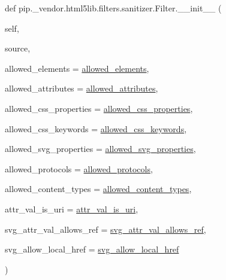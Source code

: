 {\footnotesize\ttfamily def pip.\+\_\+vendor.\+html5lib.\+filters.\+sanitizer.\+Filter.\+\_\+\+\_\+init\+\_\+\+\_\+ (\begin{DoxyParamCaption}\item[{}]{self,  }\item[{}]{source,  }\item[{}]{allowed\+\_\+elements = {\ttfamily \hyperlink{classpip_1_1__vendor_1_1html5lib_1_1filters_1_1sanitizer_1_1Filter_adcd9514fffd4234aa1285720ebfb7b17}{allowed\+\_\+elements}},  }\item[{}]{allowed\+\_\+attributes = {\ttfamily \hyperlink{classpip_1_1__vendor_1_1html5lib_1_1filters_1_1sanitizer_1_1Filter_a6f70ea4be9c51b9b91c2e566559b884b}{allowed\+\_\+attributes}},  }\item[{}]{allowed\+\_\+css\+\_\+properties = {\ttfamily \hyperlink{classpip_1_1__vendor_1_1html5lib_1_1filters_1_1sanitizer_1_1Filter_a416794d8c838f27522a46468132a39f3}{allowed\+\_\+css\+\_\+properties}},  }\item[{}]{allowed\+\_\+css\+\_\+keywords = {\ttfamily \hyperlink{classpip_1_1__vendor_1_1html5lib_1_1filters_1_1sanitizer_1_1Filter_a7c7289763ca64b15575862a15816afed}{allowed\+\_\+css\+\_\+keywords}},  }\item[{}]{allowed\+\_\+svg\+\_\+properties = {\ttfamily \hyperlink{classpip_1_1__vendor_1_1html5lib_1_1filters_1_1sanitizer_1_1Filter_af9bca56a7a284c172d28da58c49a87a2}{allowed\+\_\+svg\+\_\+properties}},  }\item[{}]{allowed\+\_\+protocols = {\ttfamily \hyperlink{classpip_1_1__vendor_1_1html5lib_1_1filters_1_1sanitizer_1_1Filter_a0ae8ca41be5bfb1bff4fb2846216afa9}{allowed\+\_\+protocols}},  }\item[{}]{allowed\+\_\+content\+\_\+types = {\ttfamily \hyperlink{classpip_1_1__vendor_1_1html5lib_1_1filters_1_1sanitizer_1_1Filter_a12c8958496fa39ad6f2aa9048afe69b2}{allowed\+\_\+content\+\_\+types}},  }\item[{}]{attr\+\_\+val\+\_\+is\+\_\+uri = {\ttfamily \hyperlink{classpip_1_1__vendor_1_1html5lib_1_1filters_1_1sanitizer_1_1Filter_a60507caa7929ffa5562fc2b0db08dc8b}{attr\+\_\+val\+\_\+is\+\_\+uri}},  }\item[{}]{svg\+\_\+attr\+\_\+val\+\_\+allows\+\_\+ref = {\ttfamily \hyperlink{classpip_1_1__vendor_1_1html5lib_1_1filters_1_1sanitizer_1_1Filter_af7642baad2028f0c8a9d5440e649b8b3}{svg\+\_\+attr\+\_\+val\+\_\+allows\+\_\+ref}},  }\item[{}]{svg\+\_\+allow\+\_\+local\+\_\+href = {\ttfamily \hyperlink{classpip_1_1__vendor_1_1html5lib_1_1filters_1_1sanitizer_1_1Filter_a6eb108defa9bd58d65167a6cf3edf502}{svg\+\_\+allow\+\_\+local\+\_\+href}} }\end{DoxyParamCaption})}

